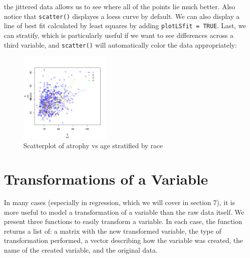 \documentclass[landscape]{article}
\renewenvironment{Schunk}{\vspace{\topsep}}{\vspace{\topsep}}
\begin{document}
\FloatBarrier
the jittered data allows us to see where all of the points lie much better. Also notice that \texttt{scatter()} displayes a loess curve by default. We can also display a line of best fit calculated by least squares by adding \texttt{plotLSfit = TRUE}. Last, we can stratify, which is particularly useful if we want to see differences across a third variable, and \texttt{scatter()} will automatically color the data appropriately:
\begin{Schunk}
\end{Schunk}
\begin{figure}[ht]
\begin{center}
\includegraphics[keepaspectratio = true, width=0.4\textwidth]{test_cases-stratscatter}
\caption{Scatterplot of atrophy vs age stratified by race}
\label{stratscatter}
\end{center}
\end{figure}
\FloatBarrier

\section{Transformations of a Variable}
In many cases (especially in regression, which we will cover in section 7), it is more useful to model a transformation of a variable than the raw data itself. We present three functions to easily transform a variable. In each case, the function returns a list of: a matrix with the new transformed variable, the type of transformation performed, a vector describing how the variable was created, the name of the created variable, and the original data.
\end{document}
